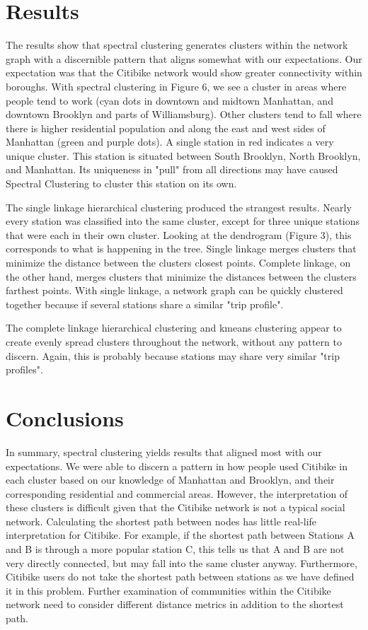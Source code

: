\documentclass[10pt,twocolumn]{article}
\begin{document}
\section{Results}
The results show that spectral clustering generates clusters within the network
graph with a discernible pattern that aligns somewhat with our expectations. Our expectation
was that the Citibike
network would show greater connectivity within boroughs. With spectral clustering in Figure 6,
we see a cluster in areas where people tend to work (cyan dots in
downtown and midtown Manhattan,
and downtown Brooklyn and parts of Williamsburg). Other clusters tend to fall where
there is higher residential population and along the east and west sides of
Manhattan (green and purple dots). A single station in red indicates a very unique cluster.
This station is situated between South Brooklyn, North Brooklyn, and Manhattan. Its
uniqueness in "pull" from all directions may have caused Spectral Clustering to cluster
this station on its own.

The single linkage hierarchical clustering produced the strangest results. Nearly
every station was classified into the same cluster, except for three unique stations
that were each in their own cluster. Looking at the dendrogram (Figure 3), this
corresponds to what is happening in the tree. Single linkage merges clusters
that minimize the distance between the clusters closest points. Complete linkage,
on the other hand, merges clusters that minimize the distances between the clusters
farthest points. With single linkage, a network graph can be quickly clustered together
because if several stations share a similar "trip profile".

The complete linkage hierarchical clustering and kmeans clustering appear to create
evenly spread clusters throughout the network, without any pattern to discern. Again,
this is probably because stations may share very similar "trip profiles".

\section{Conclusions}

In summary, spectral clustering yields results that aligned most with our expectations.
We were able to discern a pattern in how people used Citibike in each cluster based
on our knowledge of Manhattan and Brooklyn, and their corresponding residential and
commercial areas. However, the interpretation of these clusters is difficult given
that the Citibike network is not a typical social network.
Calculating the shortest path between nodes has little real-life interpretation for
Citibike. For example, if the shortest path between Stations A and B is through
a more popular station C, this tells us that A and B are not very directly connected, but
may fall into the same cluster anyway. Furthermore, Citibike users do not
take the shortest path between stations as we have defined it in this problem.
Further examination of communities within
the Citibike network need to consider different distance metrics in addition
to the shortest path.
\end{document}

